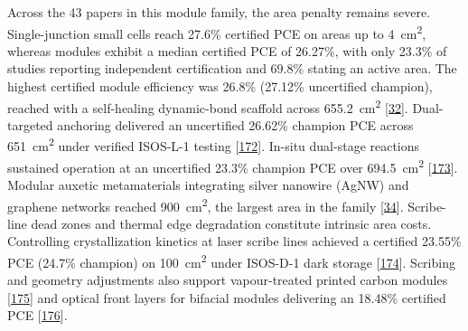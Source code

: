 \documentclass[
  11pt,
]{article}
\begin{document}
Across the 43 papers in this module family, the area penalty remains
severe. Single-junction small cells reach 27.6\% certified PCE on areas
up to \qty{4}{\centi\meter\squared}, whereas modules exhibit a median
certified PCE of 26.27\%, with only 23.3\% of studies reporting
independent certification and 69.8\% stating an active area. The highest
certified module efficiency was 26.8\% (27.12\% uncertified champion),
reached with a self-healing dynamic-bond scaffold across
\qty{655.2}{\centi\meter\squared}
{[}\href{https://doi.org/10.1002/adma.73855}{32}{]}. Dual-targeted
anchoring delivered an uncertified 26.62\% champion PCE across
\qty{651}{\centi\meter\squared} under verified ISOS-L-1 testing
{[}\href{https://doi.org/10.1002/aenm.71111}{172}{]}. In-situ dual-stage
reactions sustained operation at an uncertified 23.3\% champion PCE over
\qty{694.5}{\centi\meter\squared}
{[}\href{https://doi.org/10.1002/solr.70353}{173}{]}. Modular auxetic
metamaterials integrating silver nanowire (AgNW) and graphene networks
reached \qty{900}{\centi\meter\squared}, the largest area in the family
{[}\href{https://doi.org/10.1002/adfm.202532205}{34}{]}. Scribe-line
dead zones and thermal edge degradation constitute intrinsic area costs.
Controlling crystallization kinetics at laser scribe lines achieved a
certified 23.55\% PCE (24.7\% champion) on
\qty{100}{\centi\meter\squared} under ISOS-D-1 dark storage
{[}\href{https://doi.org/10.1038/s41467-026-69685-6}{174}{]}. Scribing
and geometry adjustments also support vapour-treated printed carbon
modules {[}\href{https://doi.org/10.1016/j.decarb.2026.100161}{175}{]}
and optical front layers for bifacial modules delivering an 18.48\%
certified PCE
{[}\href{https://doi.org/10.1016/j.esci.2026.100601}{176}{]}.
\end{document}
